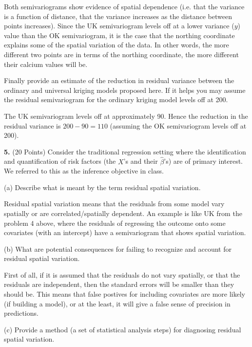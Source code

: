 \documentclass[letterpaper, 12pt]{article}
\begin{document}
{\sf
Both semivariograms show evidence of spatial dependence (i.e. that the variance is a function of distance, that the variance increases as the distance between points increases). Since the UK semivariogram levels off at a lower variance ($y$) value than the OK semivariogram, it is the case that the northing coordinate explains some of the spatial variation of the data. In other words, the more different two points are in terms of the northing coordinate, the more different their calcium values will be.
}

Finally provide an estimate of the reduction in residual variance between the ordinary and universal kriging models proposed here. If it helps you may assume the residual semivariogram for the ordinary kriging model levels off at 200.

{\sf
The UK semivariogram levels off at approximately 90. Hence the reduction in the residual variance is $200 - 90 = 110$ (assuming the OK semivariogram levels off at 200).
}

\textbf{5.} (20 Points)
Consider the traditional regression setting where the identification and quantification of risk factors (the $X$'s and their $\hat{\beta}$'s) are of primary interest. We referred to this as the inference objective in class. 

(a) Describe what is meant by the term residual spatial variation. 

{\sf
Residual spatial variation means that the residuals from some model vary spatially or are correlated/spatially dependent. An example is like UK from the problem 4 above, where the residuals of regressing the outcome onto some covariates (with an intercept) have a semivariogram that shows spatial variation.
}

(b) What are potential consequences for failing to recognize and account for residual spatial variation.

{\sf
First of all, if it is assumed that the residuals do not vary spatially, or that the residuals are independent, then the standard errors will be smaller than they should be. This means that false postives for including covariates are more likely (if building a model), or at the least, it will give a false sense of precision in predictions.
}

(c) Provide a method (a set of statistical analysis steps) for diagnosing residual spatial variation. 
\end{document}
